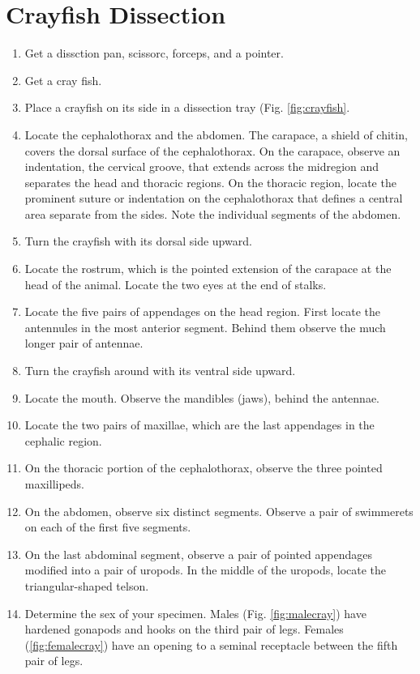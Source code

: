 \documentclass[]{book}
\providecommand{\tightlist}{%
  \setlength{\itemsep}{0pt}\setlength{\parskip}{0pt}}
\begin{document}
\hypertarget{crayfish-dissection}{%
\section{Crayfish Dissection}\label{crayfish-dissection}}

\begin{enumerate}
\def\labelenumi{\arabic{enumi}.}
\tightlist
\item
  Get a dissction pan, scissorc, forceps, and a pointer.
\item
  Get a cray fish.
\item
  Place a crayfish on its side in a dissection tray (Fig. \ref{fig:crayfish}.
\item
  Locate the cephalothorax and the abdomen. The carapace, a shield of chitin, covers the dorsal surface of the cephalothorax. On the carapace, observe an indentation, the cervical groove, that extends across the midregion and separates the head and thoracic regions. On the thoracic region, locate the prominent suture or indentation on the cephalothorax that defines a central area separate from the sides. Note the individual segments of the abdomen.
\item
  Turn the crayfish with its dorsal side upward.
\item
  Locate the rostrum, which is the pointed extension of the carapace at the head of the animal. Locate the two eyes at the end of stalks.
\item
  Locate the five pairs of appendages on the head region. First locate the antennules in the most anterior segment. Behind them observe the much longer pair of antennae.
\item
  Turn the crayfish around with its ventral side upward.
\item
  Locate the mouth. Observe the mandibles (jaws), behind the antennae.
\item
  Locate the two pairs of maxillae, which are the last appendages in the cephalic region.
\item
  On the thoracic portion of the cephalothorax, observe the three pointed maxillipeds.
\item
  On the abdomen, observe six distinct segments. Observe a pair of swimmerets on each of the first five segments.
\item
  On the last abdominal segment, observe a pair of pointed appendages modified into a pair of uropods. In the middle of the uropods, locate the triangular-shaped telson.
\item
  Determine the sex of your specimen. Males (Fig. \ref{fig:malecray}) have hardened gonapods and hooks on the third pair of legs. Females (\ref{fig:femalecray}) have an opening to a seminal receptacle between the fifth pair of legs.

\end{enumerate}
\end{document}
